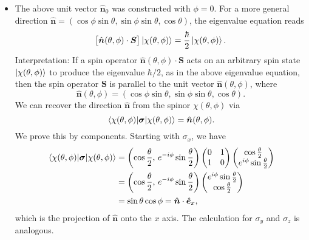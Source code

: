 \documentclass[11pt, a4paper]{article}
\renewcommand{\vec}[1]{\bm{#1}}  %
\newcommand{\uvec}[1]{\hat{\vec{#1}}}  %
\renewcommand{\S}{\vec{S}}  %
\begin{document}
\begin{itemize}
    \item The above unit vector $ \uvec{n}_{0} $ was constructed with $ \phi = 0 $. For a more general direction $ \uvec{n} = (\cos \phi \sin \theta, \sin \phi \sin \theta, \cos \theta) $, the eigenvalue equation reads
	\begin{equation*}
        \big[ \uvec{n}(\theta, \phi) \cdot \S \big] \ket{\chi(\theta, \phi)} = \frac{\hbar}{2} \ket{\chi(\theta, \phi)}.
	\end{equation*}
    Interpretation: If a spin operator $ \uvec{n}(\theta, \phi) \cdot \S $ acts on an arbitrary spin state $ \ket{\chi(\theta, \phi)} $ to produce the eigenvalue $ \hbar/2 $, as in the above eigenvalue equation, then the spin operator $ \S $ is parallel to the unit vector $ \uvec{n}(\theta, \phi) $, where
    \begin{equation*}
        \uvec{n}(\theta, \phi) = (\cos \phi \sin \theta, \sin \phi \sin \theta, \cos \theta).
    \end{equation*}
    We can recover the direction $ \uvec{n} $ from the spinor $ \chi(\theta, \phi) $ via
	\begin{equation*}
		\mel{\chi(\theta, \phi)}{\vec{\sigma}}{\chi(\theta, \phi)} = \uvec{n}(\theta, \phi).
	\end{equation*}
	We prove this by components. Starting with $ \sigma_{x} $, we have
	\begin{align*}
		\mel{\chi(\theta, \phi)}{\vec{\sigma}}{\chi(\theta, \phi)} &= \left(\cos\frac{\theta}{2}, \, e^{-i\phi}\sin \frac{\theta}{2}\right)
		\begin{pmatrix}
			0 & 1\\
			1 & 0
		\end{pmatrix}
		\begin{pmatrix}
			\cos \frac{\theta}{2}\\
			e^{i\phi}\sin \frac{\theta}{2}
		\end{pmatrix}\\
		& = \left(\cos\frac{\theta}{2}, \, e^{-i\phi}\sin \frac{\theta}{2}\right)
		\begin{pmatrix}
			e^{i\phi}\sin \frac{\theta}{2}\\
			\cos \frac{\theta}{2}
		\end{pmatrix}\\
		& = \sin \theta \cos \phi = \uvec{n}\cdot \uvec{e}_{x},
	\end{align*}
    which is the projection of $ \uvec{n} $ onto the $ x $ axis. The calculation for $ \sigma_{y} $ and $ \sigma_{z} $ is analogous.
	
\end{itemize}
\end{document}
